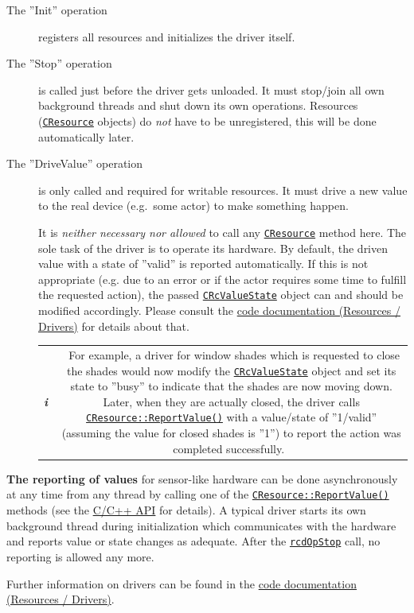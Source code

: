 \documentclass[12pt,english,parskip=half,headheight=19pt]{scrreprt}
\newcommand{\infobox}[1]{
  \par
  \medskip
  \hfill
  \setlength\arrayrulewidth{1pt}
  \begin{tabular}[t]{c|c|}
    \parbox{1.8em}{\hfill\textit{\Huge\textbf{i}\,}}
    &
    \,\parbox{0.89\linewidth}{\setlength{\parskip}{0.5em} \small #1}\,
  \end{tabular}
  \medskip
  \par
}
\newcommand{\refdoc}[2]{\href{#1}{#2}}              %
\newcommand{\refapic}[1]{\href{home2l-api_c/index.html}{\mbox{\texttt{#1}}}}            %
\newcommand{\refapicgroup}[2]{\href{home2l-api_c/group__#1.html}{#2}}
\newcommand{\theapic}{\refdoc{home2l-api_c/index.html}{C/C++ API}}
\begin{document}
\begin{description}

\item[The ''Init'' operation]
  registers all resources and initializes the driver itself.

\item[The ''Stop'' operation]
  is called just before the driver gets unloaded. It must stop/join all own background
  threads and shut down its own operations.
  Resources (\refapic{CResource} objects) do \textit{not} have to be unregistered,
  this will be done automatically later.

\item[The ''DriveValue'' operation]
  is only called and required for writable resources. It must drive a new value
  to the real device (e.g.~some actor) to make something happen.
  
  It is \textit{neither necessary nor allowed} to call any \refapic{CResource} method here.
  The sole task of the driver is to operate its hardware. By default, the driven value with
  a state of ''valid'' is reported automatically. If this is not appropriate
  (e.g. due to an error or if the actor requires some time to fulfill the requested action),
  the passed \refapic{CRcValueState} object can and should be modified accordingly.
  Please consult the \refapicgroup{resources__drivers}{code documentation (Resources / Drivers)}
  for details about that.

  \infobox{
    For example, a driver for window shades which is requested to close the shades
    would now modify the \refapic{CRcValueState} object and set its state to ''busy'' to indicate
    that the shades are now moving down.
    Later, when they are actually closed, the driver calls \refapic{CResource::ReportValue()}
    with a value/state of ''1/valid'' (assuming the value for closed shades is ''1'')
    to report the action was completed successfully.
  }

\end{description}

\textbf{The reporting of values} for sensor-like hardware can be done asynchronously at any time from any thread by calling one of the \refapic{CResource::ReportValue()} methods (see the \theapic{} for details).
A typical driver starts its own background thread during initialization which communicates with the hardware and reports value or state changes as adequate. After the \refapic{rcdOpStop} call, no reporting is allowed any more.

Further information on drivers can be found in the \refapicgroup{resources__drivers}{code documentation (Resources / Drivers)}.
\end{document}
